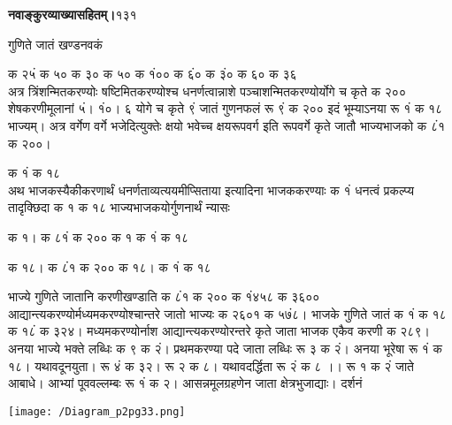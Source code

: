 \documentclass[11pt, openany]{book}
\begin{document}
\onehalfspacing
\hspace{2in}\textbf{नवाङ्कुरव्याख्यासहितम्।}\hspace{2in}१३१

\vspace{5mm}

\begin{sloppypar}
\hangindent=0.2in \hspace{0.2in}गुणिते जातं खण्डनवकं

\hangindent=0.2in क २५ं क ५० क ३० क ५० क १ं०० क ६ं० क ३ं० क ६० क ३६\\

\hangindent=0.2in \hspace{0.2in}अत्र त्रिंशन्मितकरण्योः षष्टिमितकरण्योश्च धनर्णत्वान्नाशे पञ्चाशन्मितकरण्योर्योगे च कृते क २०० शेषकरणीमूलानां ५ं। १ं०। ६ योगे च कृते ९ं जातं गुणनफलं रू ९ं क २०० इदं भूम्याऽनया रू १ं क १८ भाज्यम्। अत्र वर्गेण वर्गे भजेदित्युक्तेः क्षयो भवेच्च क्षयरूपवर्ग इति रूपवर्गे कृते जातौ भाज्यभाजको क ८ं१ क २००।

\hspace{1.25in}क १ं क १८\\

\hangindent=0.2in \hspace{0.2in}अथ भाजकस्यैकीकरणार्थं धनर्णताव्यत्ययमीप्सिताया इत्यादिना भाजककरण्याः क १ं धनत्वं प्रकल्प्य तादृक्छिदा क १ क १८ भाज्यभाजकयोर्गुणनार्थं न्यासः

\begin{center}
 क १। क ८१ं क २००\hspace{0.5in} क १ क १ं क १८

 क १८। क ८ं१ क २००\hspace{0.5in} क १८। क १ं क १८
\end{center}

\hangindent=0.2in \hspace{0.2in}भाज्ये गुणिते जातानि करणीखण्डाति क ८ं१ क २०० क १ं४५८ क ३६०० आद्यान्त्यकरण्योर्मध्यमकरण्योश्चान्तरे जातो भाज्यः क २६०१ क ५७ं८। भाजके गुणिते जातं क १ं क १८ क १८ं क ३२४। मध्यमकरण्योर्नाश आद्यान्त्यकरण्योरन्तरे कृते जाता भाजक एकैव करणी क २८९। अनया भाज्ये भक्ते लब्धिः क ९ क २ं। प्रथमकरण्या पदे जाता लब्धिः रू ३ क २ं। अनया भूरेषा रू १ं क १८। यथावदूनयुता। रू ४ं क ३२। रू २ क ८। यथावदर्द्धिता रू २ं क ८ ।। रू १ क २ं जाते आबाधे। आभ्यां पूववल्लम्बः रू १ं क २। आसन्नमूलग्रहणेन जाता क्षेत्रभुजाद्याः। दर्शनं

\begin{center}
    \texttt{[image: /Diagram\_p2pg33.png]}
\end{center}
\end{sloppypar}
\thispagestyle{empty}
\newpage
\end{document}
